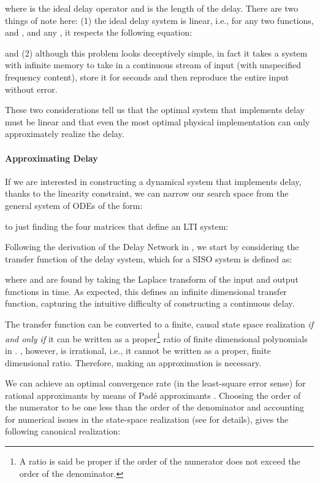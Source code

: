 \documentclass{article}
\begin{document}
where  is the ideal delay operator and  is the length of the delay. There are two things of note here: (1) the ideal delay system is linear, i.e., for any two functions,  and , and any , it respects the following equation:

and (2) although this problem looks deceptively simple, in fact it takes a system with infinite memory to take in a continuous stream of input (with unspecified frequency content), store it for  seconds and then reproduce the entire input without error.

These two considerations tell us that the optimal system that implements delay must be linear and that even the most optimal physical implementation can only approximately realize the delay.  

\paragraph{Approximating Delay} If we are interested in constructing a dynamical system that implements delay, thanks to the linearity constraint, we can narrow our search space from the general system of ODEs of the form:

to just finding the four matrices  that define an LTI system:

Following the derivation of the Delay Network in \citet{voelker2018improving}, we start by considering the transfer function of the delay system, which for a SISO system is defined as:

where  and  are found by taking the Laplace transform of the input and output functions in time. As expected, this defines an infinite dimensional transfer function, capturing the intuitive difficulty of constructing a continuous delay.

The transfer function can be converted to a finite, causal state space realization \textit{if and only if} it can be written as a proper\footnote{A ratio  is said be proper if the order of the numerator does not exceed the order of the denominator.} ratio of finite dimensional polynomials in  \cite{brogan1991modern}. , however, is irrational, i.e., it cannot be written as a proper, finite dimensional ratio.  Therefore,  making an approximation is necessary.

We can achieve an optimal convergence rate (in the least-square error sense) for rational approximants by means of Padé approximants \cite{partington2004some}. Choosing the order of the numerator to be one less than the order of the denominator and accounting for numerical issues in the state-space realization (see \citet{voelker2018improving} for details), gives the following canonical realization:
\end{document}
